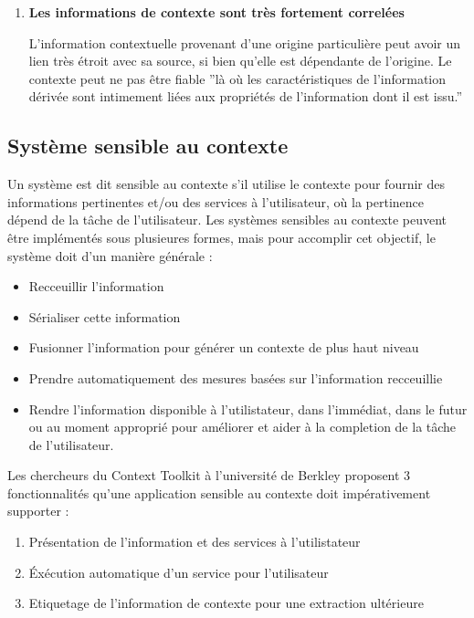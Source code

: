 \begin{enumerate}
    \item \textbf{Les informations de contexte sont très fortement correlées}

	    L'information contextuelle provenant d'une origine particulière peut
	    avoir un lien très étroit avec sa source, si bien qu'elle est
	    dépendante de l'origine.
	    Le contexte peut ne pas être fiable ''là où les caractéristiques de
	    l'information dérivée sont intimement liées aux propriétés de
	    l'information dont il est issu.'' \cite{catharina_context_2002}

\end{enumerate}

\subsection{Système sensible au contexte}

Un système est dit sensible au contexte s'il utilise le contexte pour fournir
des informations pertinentes et/ou des services à l'utilisateur, où la
pertinence dépend de la tâche de l'utilisateur. Les systèmes sensibles au
contexte peuvent être implémentés sous plusieures formes, mais pour accomplir
cet objectif, le système doit d'un manière générale :

\begin{itemize}
    \item Recceuillir l'information
    \item Sérialiser cette information
    \item Fusionner l'information pour générer un contexte de plus haut niveau
    \item Prendre automatiquement des mesures basées sur l'information
	    recceuillie
    \item Rendre l'information disponible à l'utilistateur, dans l'immédiat,
	    dans le futur ou au moment approprié pour améliorer et aider à la
	    completion de la tâche de l'utilisateur.
\end{itemize}

Les chercheurs du Context Toolkit à l'université de Berkley proposent 3
fonctionnalités qu'une application sensible au contexte doit impérativement
supporter : \cite{dey_providing_2000}

\begin{enumerate}
    \item Présentation de l'information et des services à l'utilistateur
    \item Éxécution automatique d'un service pour l'utilisateur
    \item Etiquetage de l'information de contexte pour une extraction ultérieure
\end{enumerate}

